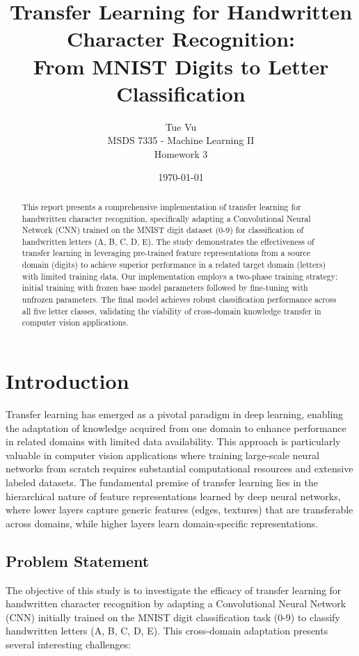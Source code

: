 \documentclass[12pt,a4paper]{article}
\title{\textbf{Transfer Learning for Handwritten Character Recognition:\\From MNIST Digits to Letter Classification}}
\author{Tue Vu \\MSDS 7335 - Machine Learning II\\Homework 3}
\date{\today}
\begin{document}
\maketitle

\begin{abstract}
This report presents a comprehensive implementation of transfer learning for handwritten character recognition, specifically adapting a Convolutional Neural Network (CNN) trained on the MNIST digit dataset (0-9) for classification of handwritten letters (A, B, C, D, E). The study demonstrates the effectiveness of transfer learning in leveraging pre-trained feature representations from a source domain (digits) to achieve superior performance in a related target domain (letters) with limited training data. Our implementation employs a two-phase training strategy: initial training with frozen base model parameters followed by fine-tuning with unfrozen parameters. The final model achieves robust classification performance across all five letter classes, validating the viability of cross-domain knowledge transfer in computer vision applications.
\end{abstract}

\tableofcontents
\newpage

\section{Introduction}

Transfer learning has emerged as a pivotal paradigm in deep learning, enabling the adaptation of knowledge acquired from one domain to enhance performance in related domains with limited data availability. This approach is particularly valuable in computer vision applications where training large-scale neural networks from scratch requires substantial computational resources and extensive labeled datasets. The fundamental premise of transfer learning lies in the hierarchical nature of feature representations learned by deep neural networks, where lower layers capture generic features (edges, textures) that are transferable across domains, while higher layers learn domain-specific representations.

\subsection{Problem Statement}

The objective of this study is to investigate the efficacy of transfer learning for handwritten character recognition by adapting a Convolutional Neural Network (CNN) initially trained on the MNIST digit classification task (0-9) to classify handwritten letters (A, B, C, D, E). This cross-domain adaptation presents several interesting challenges:
\end{document}
